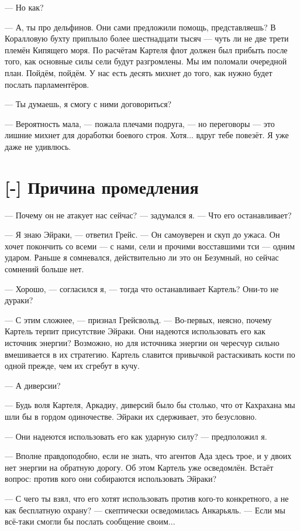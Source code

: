 --- Но как?

--- А, ты про дельфинов.
Они сами предложили помощь, представляешь?
В Коралловую бухту приплыло более шестнадцати тысяч --- чуть ли не две трети племён Кипящего моря.
По расчётам Картеля флот должен был прибыть после того, как основные силы сели будут разгромлены.
Мы им поломали очередной план.
Пойдём, пойдём.
У нас есть десять михнет до того, как нужно будет послать парламентёров.

--- Ты думаешь, я смогу с ними договориться?

--- Вероятность мала, --- пожала плечами подруга, --- но переговоры --- это лишние михнет для доработки боевого строя.
Хотя... вдруг тебе повезёт.
Я уже даже не удивлюсь.

\section{[-] Причина промедления}

\textspace

--- Почему он не атакует нас сейчас? --- задумался я.
--- Что его останавливает?

--- Я знаю Эйраки, --- ответил Грейс.
--- Он самоуверен и скуп до ужаса.
Он хочет покончить со всеми --- с нами, сели и прочими восставшими тси --- одним ударом.
Раньше я сомневался, действительно ли это он Безумный, но сейчас сомнений больше нет.

--- Хорошо, --- согласился я, --- тогда что останавливает Картель?
Они-то не дураки?

--- С этим сложнее, --- признал Грейсвольд.
--- Во-первых, неясно, почему Картель терпит присутствие Эйраки.
Они надеются использовать его как источник энергии?
Возможно, но для источника энергии он чересчур сильно вмешивается в их стратегию.
Картель славится привычкой растаскивать кости по одной прежде, чем их сгребут в кучу.

--- А диверсии?

--- Будь воля Картеля, Аркадиу, диверсий было бы столько, что от Кахрахана мы шли бы в гордом одиночестве.
Эйраки их сдерживает, это безусловно.

--- Они надеются использовать его как ударную силу? --- предположил я.

--- Вполне правдоподобно, если не знать, что агентов Ада здесь трое, и у двоих нет энергии на обратную дорогу.
Об этом Картель уже осведомлён.
Встаёт вопрос: против кого они собираются использовать Эйраки?

--- С чего ты взял, что его хотят использовать против кого-то конкретного, а не как бесплатную охрану? --- скептически осведомилась Анкарьяль.
--- Если мы всё-таки смогли бы послать сообщение своим...

